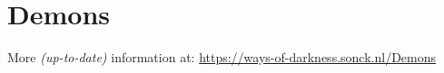 \section{Demons}
More \textit{(up-to-date)} information at: \url{https://ways-of-darkness.sonck.nl/Demons}\newline
